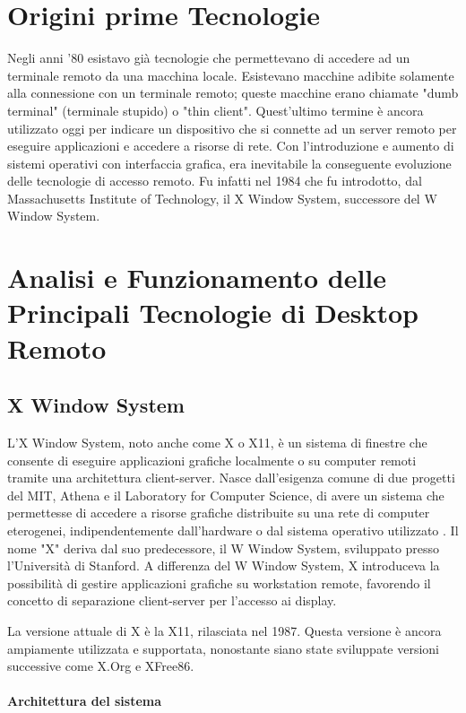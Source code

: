 \documentclass[12pt,a4paper,openright,twoside]{book}
\begin{document}
\section{Origini prime Tecnologie}
Negli anni '80 esistavo già tecnologie che permettevano di accedere ad un terminale remoto da una macchina locale. Esistevano macchine adibite solamente alla connessione con un terminale remoto; queste macchine erano chiamate "dumb terminal" (terminale stupido) o "thin client". Quest'ultimo termine è ancora utilizzato oggi per indicare un dispositivo che si connette ad un server remoto per eseguire applicazioni e accedere a risorse di rete.
Con l'introduzione e aumento di sistemi operativi con interfaccia grafica, era inevitabile la conseguente evoluzione delle tecnologie di accesso remoto. Fu infatti nel 1984 che fu introdotto, dal Massachusetts Institute of Technology, il X Window System, successore del W Window System.

\section{Analisi e Funzionamento delle Principali Tecnologie di Desktop Remoto} 

\subsection{X Window System}
L'X Window System, noto anche come X o X11, è un sistema di finestre che consente di eseguire applicazioni grafiche localmente o su computer remoti tramite una architettura client-server. 
Nasce dall'esigenza comune di due progetti del MIT, Athena e il Laboratory for Computer Science, di avere un sistema che permettesse di accedere a risorse grafiche distribuite su una rete di computer eterogenei, indipendentemente dall'hardware o dal sistema operativo utilizzato \cite{scheifler1986x}. 
Il nome "X" deriva dal suo predecessore, il W Window System, sviluppato presso l'Università di Stanford. A differenza del W Window System, X introduceva la possibilità di gestire applicazioni grafiche su workstation remote, favorendo il concetto di separazione client-server per l'accesso ai display.

La versione attuale di X è la X11, rilasciata nel 1987. Questa versione è ancora ampiamente utilizzata e supportata, nonostante siano state sviluppate versioni successive come X.Org e XFree86.

\paragraph{Architettura del sistema}
\end{document}
